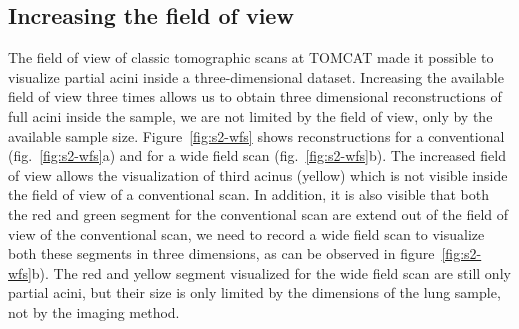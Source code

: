 \subsection{Increasing the field of view}
The field of view of classic tomographic scans at TOMCAT made it possible to visualize partial acini inside a three-dimensional dataset. Increasing the available field of view three times allows us to obtain three dimensional reconstructions of full acini inside the sample, we are not limited by the field of view, only by the available sample size. Figure~\ref{fig:s2-wfs} shows reconstructions for a conventional (fig.~\ref{fig:s2-wfs}a) and for a wide field scan (fig.~\ref{fig:s2-wfs}b). The increased field of view allows the visualization of third acinus (yellow) which is not visible inside the field of view of a conventional scan. In addition, it is also visible that both the red and green segment for the conventional scan are extend out of the field of view of the conventional scan, we need to record a wide field scan to visualize both these segments in three dimensions, as can be observed in figure~\ref{fig:s2-wfs}b). The red and yellow segment visualized for the wide field scan are still only partial acini, but their size is only limited by the dimensions of the lung sample, not by the imaging method.


